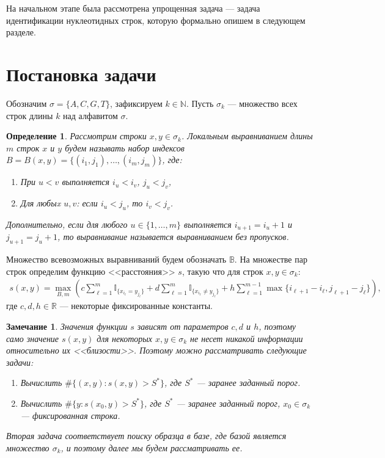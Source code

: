 \documentclass{spisok-article}
\newtheorem{dfn}{Определение}
\newtheorem{note}{Замечание}
\begin{document}
  На начальном этапе была рассмотрена упрощенная задача --- задача идентификации нуклеотидных строк, которую формально опишем в следующем разделе.


\section{Постановка задачи}
Обозначим $\sigma = \{A, C, G, T\}$, зафиксируем $k \in \mathbb{N}$.
Пусть $\sigma_k$ --- множество всех строк длины $k$ над алфавитом $\sigma$.
\begin{dfn}
\label{dfn:aln}
Рассмотрим строки $x, y \in \sigma_k$. Локальным выравниванием длины $m$ строк $x$ и $y$ будем называть набор индексов $B = B(x, y) = \{(i_1, j_1), \ldots, (i_m, j_m)\}$, где: 
\begin{enumerate}
\item При $u < v$ выполняется $i_u < i_v$, $j_u < j_v$, 
\item Для любыx $u, v$: если $i_u  < j_u$, то $i_v < j_v$.
\end{enumerate}
Дополнительно, если для любого $u \in \{1, \ldots, m \}$  выполняется $i_{u+1} = i_u + 1$ и $j_{u + 1} = j_u + 1$,
то выравнивание называется выравниванием без пропусков.
\end{dfn}
Множество всевозможных выравниваний будем обозначать $\mathbb{B}$. На множестве пар строк определим функцию <<расстояния>> $s$, такую что для строк $x, y \in \sigma_k$:
\begin{gather*}
s(x, y)\!=\!\max\limits_{B, m}\!\left(\!c\!\sum\limits_{\ell = 1}^{m} \mathbb{I}_{\{x_{i_\ell} = y_{j_\ell}\!\} }\!+\!d\!\sum\limits_{\ell = 1}^{m} \mathbb{I}_{\{x_{i_\ell} \ne y_{j_\ell}\!\}}\!+\!h\!\sum\limits_{\ell = 1}^{m - 1}\!\max \{ i_{\ell \!+\!1}\!-\!i_\ell, j_{\ell \!+ \!1}\!-\!j_\ell\}\!\right)\!,
\end{gather*}
где $c, d, h \in \mathbb{R}$ --- некоторые фиксированные константы.


\begin{note}
Значения функции $s$ зависят от параметров $c, d$ и $h$, поэтому само значение $s(x, y)$ для некоторых $x, y \in \sigma_k$ не несет никакой информации относительно их <<близости>>.
Поэтому можно рассматривать следующие задачи:
\begin{enumerate}
\item Вычислить $\# \{(x, y):s(x, y) > S^* \}$, где $S^*$ --- заранее заданный порог.  
\item Вычислить $\# \{y:s(x_0, y) > S^* \}$, где $S^*$ --- заранее заданный порог, $x_0 \in \sigma_k$ --- фиксированная строка.
\end{enumerate}
Вторая задача соответствует поиску образца в базе, где базой является множество $\sigma_k$, и поэтому далее мы будем рассматривать ее.
\label{note:probl}
\end{note}
\end{document}
